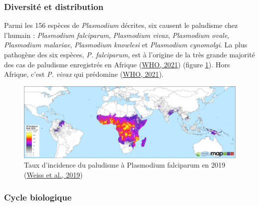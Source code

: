 \documentclass[12pt,twoside]{reedthesis}
\begin{document}
\hypertarget{diversituxe9-et-distribution}{%
\subsubsection{Diversité et distribution}\label{diversituxe9-et-distribution}}

Parmi les 156 espèces de \emph{Plasmodium} décrites, six causent le paludisme chez l'humain : \emph{Plasmodium falciparum}, \emph{Plasmodium vivax}, \emph{Plasmodium ovale}, \emph{Plasmodium malariae}, \emph{Plasmodium knowlesi} et \emph{Plasmodium cynomolgi}. La plus pathogène des six espèces, \emph{P. falciparum}, est à l'origine de la très grande majorité des cas de paludisme enregistrés en Afrique (\protect\hyperlink{ref-who_2021}{WHO, 2021}) (figure \ref{fig:global-pfpr-2019}). Hors Afrique, c'est \emph{P. vivax} qui prédomine (\protect\hyperlink{ref-who_2021}{WHO, 2021}).\\
\begin{figure}

\includegraphics[width=1.1\linewidth]{figure/global_incidence_rate_2019} \hfill{}

\caption[Taux d'incidence du paludisme à Plasmodium falciparum en 2019]{Taux d'incidence du paludisme à Plasmodium falciparum en 2019 (\protect\hyperlink{ref-weiss_mapping_2019}{Weiss et al., 2019})}\label{fig:global-pfpr-2019}
\end{figure}
\hypertarget{cycle-biologique}{%
\subsubsection{Cycle biologique}\label{cycle-biologique}}
\end{document}
